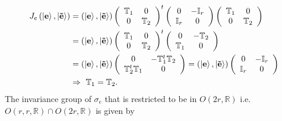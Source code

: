 \documentclass[aps,preprint]{revtex4}
\begin{document}
\begin{align}
J_{e}\left( \left\vert \mathbf{e}\right\rangle ,\left\vert \mathbf{\tilde{e}}%
\right\rangle \right) & =\left( \left\vert \mathbf{e}\right\rangle
,\left\vert \mathbf{\tilde{e}}\right\rangle \right) \left( 
\begin{array}{cc}
\mathbb{T}_{1} & 0 \\ 
0 & \mathbb{T}_{2}%
\end{array}
\right) ^{t}\left( 
\begin{array}{cc}
0 & -\mathbb{I}_{r} \\ 
\mathbb{I}_{r} & 0%
\end{array}
\right) \left( 
\begin{array}{cc}
\mathbb{T}_{1} & 0 \\ 
0 & \mathbb{T}_{2}%
\end{array}
\right) \\
& =\left( \left\vert \mathbf{e}\right\rangle ,\left\vert \mathbf{\tilde{e}}%
\right\rangle \right) \left( 
\begin{array}{cc}
\mathbb{T}_{1} & 0 \\ 
0 & \mathbb{T}_{2}%
\end{array}
\right) ^{t}\left( 
\begin{array}{cc}
0 & -\mathbb{T}_{2} \\ 
\mathbb{T}_{1} & 0%
\end{array}
\right) \\
& =\left( \left\vert \mathbf{e}\right\rangle ,\left\vert \mathbf{\tilde{e}}%
\right\rangle \right) \left( 
\begin{array}{cc}
0 & -\mathbb{T}_{1}^{t}\mathbb{T}_{2} \\ 
\mathbb{T}_{2}^{t}\mathbb{T}_{1} & 0%
\end{array}
\right) =\left( \left\vert \mathbf{e}\right\rangle ,\left\vert \mathbf{%
\tilde{e}}\right\rangle \right) \left( 
\begin{array}{cc}
0 & -\mathbb{I}_{r} \\ 
\mathbb{I}_{r} & 0%
\end{array}
\right) \\
& \Rightarrow\text{ }\mathbb{T}_{1}=\mathbb{T}_{2}.
\end{align}
The invariance group of $\sigma_{e}$ that is restricted to be in $O\left( 2r,%
\mathbb{R}\right) $ i.e. $O\left( r,r,\mathbb{R}\right) \cap O\left( 2r,%
\mathbb{R}\right) $ is given by 
\end{document}
